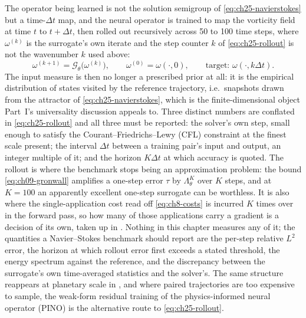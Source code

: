 The operator being learned is not the solution semigroup of
\eqref{eq:ch25-navierstokes} but a time-$\Delta t$ map, and the neural operator is
trained to map the
vorticity field at time $t$ to $t + \Delta t$, then rolled out recursively across
50 to 100 time steps, where $\omega^{(k)}$ is the surrogate's own iterate and the
step counter $k$ of \eqref{eq:ch25-rollout} is not the wavenumber $k$ used above:
\begin{equation}
  \label{eq:ch25-rollout}
  \omega^{(k+1)} = \mathcal{G}_{\theta}\big(\omega^{(k)}\big),
  \qquad \omega^{(0)} = \omega(\cdot, 0),
  \qquad \text{target: } \omega(\cdot, k\Delta t).
\end{equation}
The input measure is then no longer a prescribed prior at all: it is the empirical
distribution of states visited by the reference trajectory, i.e.\ snapshots drawn
from the attractor of \eqref{eq:ch25-navierstokes}, which is the finite-dimensional
object Part~I's universality discussion appeals to. Three distinct numbers are
conflated in \eqref{eq:ch25-rollout} and all three must be reported: the solver's
own step, small enough to satisfy the Courant--Friedrichs--Lewy (CFL) constraint at
the finest scale present; the interval $\Delta t$ between a training pair's input
and output, an integer multiple of it; and the horizon $K\Delta t$ at which
accuracy is quoted. The rollout is where
the benchmark stops being an approximation problem: the bound
\eqref{eq:ch09-gronwall} amplifies a one-step error $\tau$ by
$\Lambda_{\theta}^{K}$ over $K$ steps, and at $K = 100$ an apparently excellent
one-step surrogate can be worthless. It is also where the single-application cost
read off \eqref{eq:ch8-costs} is incurred $K$ times over in the forward pass, so how
many of those applications carry a gradient is a decision of its own,
taken up in . Nothing
in this chapter measures any of it; the
quantities a Navier--Stokes benchmark should report are the per-step relative
$L^{2}$ error, the horizon at which rollout error first exceeds a stated
threshold, the energy spectrum against the reference, and the discrepancy between
the surrogate's own time-averaged statistics and the solver's. The same structure
reappears at planetary scale in \cite{pathak2022fourcastnet}, and where paired
trajectories are too expensive to sample, the weak-form residual training of the
physics-informed neural operator (PINO) \cite{li2021physics} is the alternative
route to \eqref{eq:ch25-rollout}.

